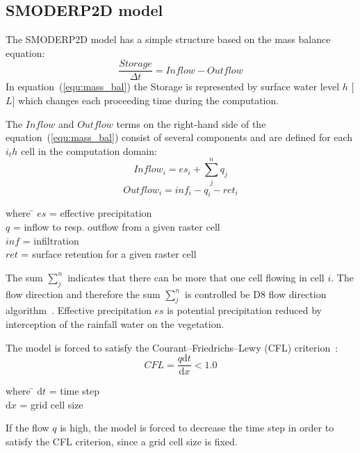 \subsection{SMODERP2D model}
The SMODERP2D model has a simple structure based on the mass balance equation:
\begin{equation}\label{equ:mass_bal}
    \frac{Storage}{\Delta t} = \nonumber  
    Inflow - Outflow
\end{equation}
In equation~(\ref{equ:mass_bal}) the Storage is represented by
surface water level $h$ [$L$] which changes each proceeding time
during the computation.

The $Inflow$ and $Outflow$ terms on the right-hand side of
the equation~(\ref{equ:mass_bal}) consist of several components and are
defined for each $i_th$ cell in the computation domain:
\begin{equation}\label{equ:inflow}
    Inflow_i = es_{i} + \sum_j^n q_{j}
\end{equation}
\begin{equation}\label{equ:outflow}
    Outflow_i = inf_{i} - q_{i} - ret_i
\end{equation}
\begin{tabbing} 
where \hspace{0.6cm} \= $es$ = effective precipitation\\
\> $q$ = inflow to resp. outflow from a given raster cell\\
\> $inf$ = infiltration\\
\> $ret$ = surface retention for a given raster cell
\end{tabbing}
The sum $\sum_j^n$ indicates that there can be more that one cell
flowing in cell $i$. The flow direction and therefore the sum $\sum_j^n$
is controlled be D8 flow direction algorithm~\cite{ocallaghan1984}.  Effective
precipitation $es$ is potential precipitation reduced by
interception of the rainfall water on the vegetation.

The model is forced to satisfy the Courant--Friedrichs--Lewy (CFL)
criterion~\cite{courant1928}:
\begin{equation}\label{equ:CFL}
    CFL = \frac{q\textrm{d}t}{\textrm{d}x} < 1.0
\end{equation}
\begin{tabbing} 
where \hspace{0.6cm} \= $\textrm{d}t$ = time step\\
\> $\textrm{d}x$ = grid cell size
\end{tabbing}
If the flow $q$ is high, the model is forced to decrease the
time step in order to satisfy the CFL criterion, since a grid cell size
is fixed.

